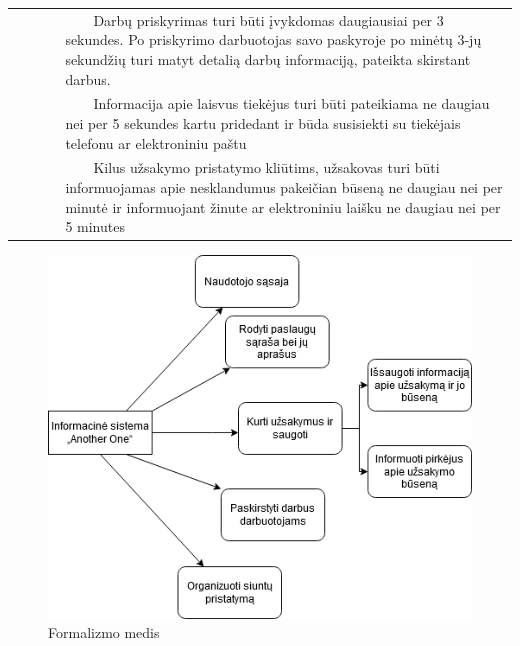 \documentclass{VUMIFPSkursinis}
\newcommand{\tabitem}{~~\llap{\textbullet}~~}
\begin{document}
\begin{center}
\begin{table}[ht]
\begin{tabular}{| p{0.1\linewidth} | p{0.9\linewidth }|}
		    &\hspace{4mm}\tabitem Darbų priskyrimas turi būti įvykdomas daugiausiai per 3 sekundes. Po priskyrimo darbuotojas savo paskyroje po minėtų 3-jų sekundžių turi matyt detalią darbų informaciją, pateikta skirstant darbus. \\
		    &\hspace{4mm}\tabitem Informacija apie laisvus tiekėjus turi būti pateikiama ne daugiau nei per 5 sekundes kartu pridedant ir būda susisiekti su tiekėjais telefonu ar elektroniniu paštu \\
		    &\hspace{4mm}\tabitem Kilus užsakymo pristatymo kliūtims, užsakovas turi būti informuojamas apie nesklandumus pakeičian būseną ne daugiau nei per minutė ir informuojant žinute ar elektroniniu laišku ne daugiau nei per 5 minutes \\ \hline
\end{tabular}
\end{table}	
\end{center}

\begin{figure}[H]
    \centering
    \includegraphics[scale=0.6]{img/fui}
    \caption{Formalizmo medis}
    \label{img:fui}
\end{figure}

\newpage
\end{document}
